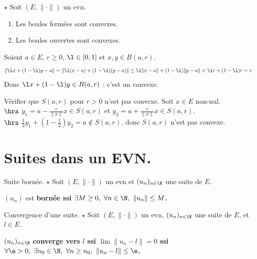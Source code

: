 \documentclass[11pt]{article}
\begin{document}
\vspace*{-0.8cm}

\begin{prop}{$\star$}{}
    Soit $(E,\|\cdot\|)$ un evn.
    \begin{enumerate}
        \item Les boules fermées sont convexes.
        \item Les boules ouvertes sont convexes.
    \end{enumerate}
    \tcblower
    Soient $a\in E$, $r\geq0$, $\l\in[0,1]$ et $x,y\in B(a,r)$.
    \begin{equation*}
        \|\l x + (1-\l)y - a\| = \|\l(x-a) + (1-\l)(y-a)\| \leq \l\|x-a\| + (1-\l)\|y-a\| < \l r + (1-\l) r = r.
    \end{equation*}
    Donc $\l x + (1-\l)y \in B(a,r)$ : c'est un convexe.
\end{prop}

\vspace*{-0.8cm}

\begin{ex}{}{}
    Vérifier que $S(a,r)$ pour $r>0$ n'est pas convexe.
    \tcblower
    Soit $x\in E$ non-nul.\\
    $\hra$ $y_1 = a - \frac{r}{\|x\|}x\in S(a,r)$ et $y_2 = a + \frac{r}{\|x\|}x\in S(a,r)$.\\
    $\hra$ $\frac{1}{2}y_1 + (1-\frac{1}{2})y_2 = a \notin S(a,r)$, donc $S(a,r)$ n'est pas convexe.
\end{ex}

\section{Suites dans un EVN.}

\begin{defi}{Suite bornée. $\star$}{}
    Soit $(E,\|\cdot\|)$ un evn et $(u_n)_{n\in\N}$ une suite de $E$.
    \begin{center}
        $(u_n)$ est \bf{bornée} ssi $\exists M \geq 0, ~ \forall n \in \N, ~ \|u_n\| \leq M$.
    \end{center}
\end{defi}

\vspace*{-0.8cm}

\begin{defi}{Convergence d'une suite. $\star$}{}
    Soit $(E,\|\cdot\|)$ un evn, $(u_n)_{n\in\N}$ une suite de $E$, et $l\in E$.
    \begin{center}
        $(u_n)_{n\in\N}$ \bf{converge} vers $l$ ssi $\lim \|u_n - l\| = 0$ ssi $\forall \e > 0, ~ \exists n_0 \in \N, ~ \forall n \geq n_0, ~ \| u_n - l \| \leq \e$.
    \end{center}
\end{defi}
\end{document}
